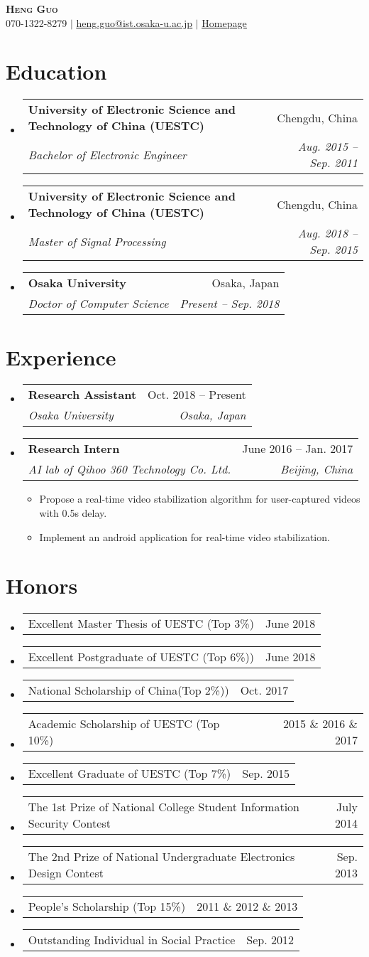 \documentclass[letterpaper,11pt]{article}
\makeatletter
\newcommand{\resumeItem}[1]{
  \item\small{
    {#1 \vspace{-2pt}}
  }
}
\newcommand{\resumeSubheading}[4]{
  \vspace{-2pt}\item
    \begin{tabular*}{0.97\textwidth}[t]{l@{\extracolsep{\fill}}r}
      \textbf{#1} & #2 \\
      \textit{\small#3} & \textit{\small #4} \\
    \end{tabular*}\vspace{-7pt}
}
\newcommand{\resumeProjectHeading}[2]{
    \item
    \begin{tabular*}{0.97\textwidth}{l@{\extracolsep{\fill}}r}
      \small#1 & #2 \\
    \end{tabular*}\vspace{-7pt}
}
\newcommand{\resumeSubHeadingListStart}{\begin{itemize}[leftmargin=0.15in, label={}]}
\newcommand{\resumeSubHeadingListEnd}{\end{itemize}}
\newcommand{\resumeItemListStart}{\begin{itemize}}
\newcommand{\resumeItemListEnd}{\end{itemize}\vspace{-5pt}}
\makeatother
\begin{document}
\begin{center}
    \textbf{\Huge \scshape  Heng Guo} \\ \vspace{4pt}
    \small 070-1322-8279 $|$ \href{mailto:heng.guo@ist.osaka-u.ac.jp}{\underline{heng.guo@ist.osaka-u.ac.jp}} $|$ 
    \href{https://gh-home.github.io/}{\underline{Homepage}}
\end{center}


\section{Education}
  \resumeSubHeadingListStart
    \resumeSubheading
      {University of Electronic Science and Technology of China (UESTC) }{Chengdu, China}
      {Bachelor of Electronic Engineer}{Aug. 2015 -- Sep. 2011}
  \resumeSubheading
      {University of Electronic Science and Technology of China (UESTC)}{Chengdu, China}
      {Master of Signal Processing}{Aug. 2018 -- Sep. 2015}
   \resumeSubheading
 		{Osaka University}{Osaka, Japan}
 		{Doctor of Computer Science}{Present -- Sep. 2018}
  \resumeSubHeadingListEnd


\section{Experience}
  \resumeSubHeadingListStart
    \resumeSubheading
      {Research Assistant}{Oct. 2018 -- Present}
      {Osaka University}{Osaka, Japan}
      
    \resumeSubheading
     {Research Intern}{June 2016 -- Jan. 2017}
	{AI lab of Qihoo 360 Technology Co. Ltd.}{Beijing, China}
     \resumeItemListStart
		\resumeItem{Propose a real-time video stabilization algorithm for user-captured videos with 0.5s delay.}
		\resumeItem{Implement an android application for real-time video stabilization.}
     \resumeItemListEnd

  \resumeSubHeadingListEnd


\section{Honors}
    \resumeSubHeadingListStart
      \resumeProjectHeading
          {Excellent Master Thesis of UESTC (Top 3\%)}{June 2018}
   
         \resumeProjectHeading
   {Excellent Postgraduate of UESTC (Top 6\%))}{June 2018}
         \resumeProjectHeading
   {National Scholarship of China(Top 2\%))}{Oct. 2017}
         \resumeProjectHeading
   {Academic Scholarship of UESTC (Top 10\%)}{2015 \& 2016 \& 2017}
         \resumeProjectHeading
   {Excellent Graduate of UESTC (Top 7\%)}{Sep. 2015}
         \resumeProjectHeading
   {The 1st Prize of National College Student Information Security Contest}{July 2014}
            \resumeProjectHeading
   {The 2nd Prize of National Undergraduate Electronics Design Contest}{Sep. 2013}
   \resumeProjectHeading
   {People's Scholarship (Top 15\%)}{2011 \& 2012 \& 2013}
   \resumeProjectHeading
   {Outstanding Individual in Social Practice}{Sep. 2012}
    \resumeSubHeadingListEnd
\end{document}
